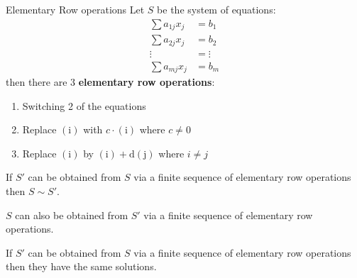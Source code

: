 \begin{definition} {Elementary Row operations}
    Let \(S\) be the system of equations:
    \begin{align}
        \sum a_{1j}x_j & = b_1 \tag{1}     \\
        \sum a_{2j}x_j & = b_2  \tag{2}    \\
        \vdots         & =\vdots \nonumber \\
        \sum a_{mj}x_j & = b_m \tag{m}
    \end{align}
    then there are 3 \textbf{elementary row operations}:
    \begin{enumerate}
        \item Switching 2 of the equations
        \item Replace \(\mathrm{(i)}\) with \(c \cdot \mathrm{(i)}\) where \(c \neq 0\)
        \item Replace \(\mathrm{(i)}\) by \(\mathrm{(i) + d(j)}\) where \(i\neq j\)
    \end{enumerate}
\end{definition}

\begin{proposition}\label{prop:2.2}
    If \(S'\) can be obtained from \(S\) via a finite sequence of elementary row operations then \(S \sim S'\).
\end{proposition}

\begin{corollary}
    \(S\) can also be obtained from \(S'\) via a finite sequence of elementary row operations.
\end{corollary}
\begin{corollary}
    If \(S'\) can be obtained from \(S\) via a finite sequence of elementary row operations then they have the same solutions.
\end{corollary}
